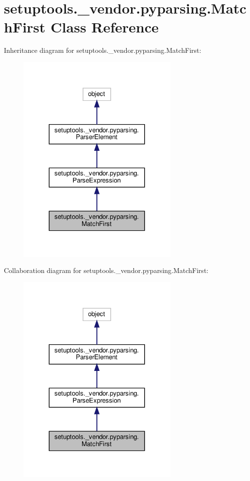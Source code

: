 \hypertarget{classsetuptools_1_1__vendor_1_1pyparsing_1_1MatchFirst}{}\section{setuptools.\+\_\+vendor.\+pyparsing.\+Match\+First Class Reference}
\label{classsetuptools_1_1__vendor_1_1pyparsing_1_1MatchFirst}


Inheritance diagram for setuptools.\+\_\+vendor.\+pyparsing.\+Match\+First\+:
\nopagebreak
\begin{figure}[H]
\begin{center}
\leavevmode
\includegraphics[width=227pt]{classsetuptools_1_1__vendor_1_1pyparsing_1_1MatchFirst__inherit__graph}
\end{center}
\end{figure}


Collaboration diagram for setuptools.\+\_\+vendor.\+pyparsing.\+Match\+First\+:
\nopagebreak
\begin{figure}[H]
\begin{center}
\leavevmode
\includegraphics[width=227pt]{classsetuptools_1_1__vendor_1_1pyparsing_1_1MatchFirst__coll__graph}
\end{center}
\end{figure}
